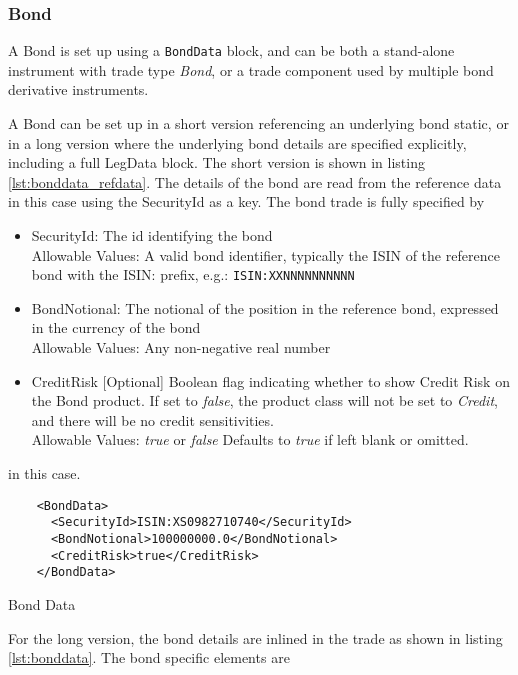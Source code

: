 \subsubsection{Bond}
\label{ss:bond}

A Bond is set up using a {\tt BondData} block, and can be both a stand-alone instrument with trade type \emph{Bond}, or a trade component used by multiple bond derivative instruments.

A Bond can be set up in a short version referencing an underlying bond static, or in a long version where the underlying bond details are specified explicitly, including a full LegData block.
The short version is shown in listing \ref{lst:bonddata_refdata}. The details of the
bond are read from the reference data in this case using the SecurityId as a key. The bond trade is fully specified by

\begin{itemize}
\item SecurityId: The id identifying the bond\\
  Allowable Values: A valid bond identifier, typically the ISIN of the reference bond with the ISIN: prefix, e.g.: \verb+ISIN:XXNNNNNNNNNN+
\item BondNotional: The notional of the position in the reference bond, expressed in the currency of the bond\\
  Allowable Values: Any non-negative real number
\item CreditRisk [Optional] Boolean flag indicating whether to show Credit Risk on the Bond product. If set to \emph{false}, the product class will  not be set to \emph{Credit}, and there will be no credit sensitivities. \\
  Allowable Values: \emph{true} or \emph{false} Defaults to \emph{true} if left blank or omitted.
\end{itemize}

in this case.

\begin{listing}[H]
\begin{verbatim}
    <BondData>
      <SecurityId>ISIN:XS0982710740</SecurityId>
      <BondNotional>100000000.0</BondNotional>
      <CreditRisk>true</CreditRisk>
    </BondData>
\end{verbatim}
\caption{Bond Data}
\label{lst:bonddata_refdata}
\end{listing}

For the long version, the bond details are inlined in the trade as shown in listing \ref{lst:bonddata}. The bond specific elements are

